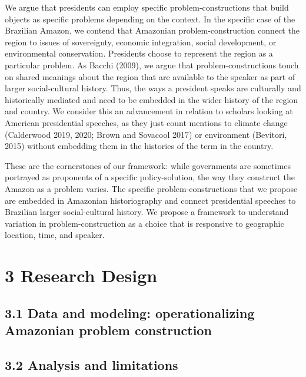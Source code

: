\documentclass[
]{article}
\begin{document}
We argue that presidents can employ specific problem-constructions that
build objects as specific problems depending on the context. In the
specific case of the Brazilian Amazon, we contend that Amazonian
problem-construction connect the region to issues of sovereignty,
economic integration, social development, or environmental conservation.
Presidents choose to represent the region as a particular problem. As
Bacchi (2009), we argue that problem-constructions touch on shared
meanings about the region that are available to the speaker as part of
larger social-cultural history. Thus, the ways a president speaks are
culturally and historically mediated and need to be embedded in the
wider history of the region and country. We consider this an advancement
in relation to scholars looking at American presidential speeches, as
they just count mentions to climate change (Calderwood 2019, 2020; Brown
and Sovacool 2017) or environment (Bevitori, 2015) without embedding
them in the histories of the term in the country.

These are the cornerstones of our framework: while governments are
sometimes portrayed as proponents of a specific policy-solution, the way
they construct the Amazon as a problem varies. The specific
problem-constructions that we propose are embedded in Amazonian
historiography and connect presidential speeches to Brazilian larger
social-cultural history. We propose a framework to understand variation
in problem-construction as a choice that is responsive to geographic
location, time, and speaker.

\hypertarget{research-design}{%
\section{3 Research Design}\label{research-design}}

\hypertarget{data-and-modeling-operationalizing-amazonian-problem-construction}{%
\subsection{3.1 Data and modeling: operationalizing Amazonian problem
construction}\label{data-and-modeling-operationalizing-amazonian-problem-construction}}

\hypertarget{analysis-and-limitations}{%
\subsection{3.2 Analysis and
limitations}\label{analysis-and-limitations}}
\end{document}
